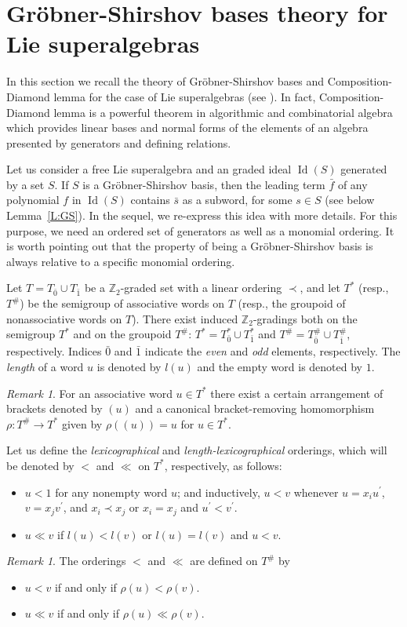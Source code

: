 \documentclass[reqno]{amsart}
\theoremstyle{definition}
\theoremstyle{remark}
\newtheorem{remark}[theorem]{Remark}
\numberwithin{equation}{section}
\DeclareMathOperator{\Id}{Id}
\begin{document}
\section{Gr\"obner-Shirshov bases theory for Lie superalgebras} \label{S:GS}
In this section we recall the theory of Gr\"obner-Shirshov bases and Composition-Diamond lemma for the case of Lie superalgebras (see \cite{B2}). In fact, Composition-Diamond lemma is a powerful theorem in algorithmic
and combinatorial algebra which provides linear bases and normal forms
of the elements of an algebra presented by generators and defining relations.

 Let us consider a free Lie superalgebra and an graded ideal $\Id(S)$ generated by a set $S$. If $S$ is a Gr\"obner-Shirshov basis, then the leading term $\bar{f}$ of any polynomial $f$ in $\Id(S)$ contains $\bar{s}$ as a subword, for some $s \in S$ (see below Lemma~\ref{L:GS}). In the sequel, we re-express this idea with more details. For this purpose, we need an ordered set of generators as well as a monomial ordering. It is worth pointing out that the property of being a Gr\"obner-Shirshov basis is always relative to a specific monomial ordering.

Let $T=T_{\bar{0}} \cup T_{\bar{1}}$ be a $\mathbb{Z}_2$-graded set with a linear ordering $\prec$, and let $T^{\ast}$ (resp., $T^{\#}$) be the semigroup of associative words on $T$ (resp., the groupoid of nonassociative words on $T$). There exist induced $\mathbb{Z}_2$-gradings both on the semigroup $T^{\ast}$ and on the groupoid $T^{\#}$: $T^{\ast} = T_{\bar{0}}^{\ast} \cup T_{\bar{1}}^{\ast}$ and $T^{\#}=T_{\bar{0}}^{\#} \cup T_{\bar{1}}^{\#}$, respectively.
Indices $\bar{0}$ and $\bar{1}$ indicate the \emph{even}  and  \emph{odd} elements, respectively. The \emph{length} of a word $u$ is denoted by $l(u)$ and the empty word is denoted by $1$.

\begin{remark}
For an associative word $u \in T^{\ast}$ there exist a certain arrangement of brackets denoted by $(u)$ and a canonical bracket-removing homomorphism $\rho \colon T^{\#} \to T^{\ast}$ given by $\rho((u))=u$ for $u \in T^{\ast}$.
\end{remark}
Let us define the \emph{lexicographical} and \emph{length-lexicographical} orderings, which will be denoted by $<$ and $\ll$ on $T^{\ast}$, respectively, as follows:
\begin{itemize}
    \item [(i)] $u < 1$ for any nonempty word $u$; and inductively, $u < v$ whenever $u=x_iu^{\prime}$, $v=x_jv^{\prime}$, and $x_i \prec x_j$ or $x_i=x_j$ and $u^{\prime} < v^{\prime}$.
    \item[(ii)] $u \ll v$ if $l(u) < l(v)$ or $l(u)=l(v)$ and $u < v$.
\end{itemize}
\begin{remark}
The orderings $<$ and $\ll$ are defined on $T^{\#}$ by
\begin{itemize}
    \item $u < v$ if and only if $\rho(u) < \rho(v)$.
    \item $u \ll v$ if and only if $\rho(u) \ll \rho(v)$.
\end{itemize}
\end{remark}
\end{document}
